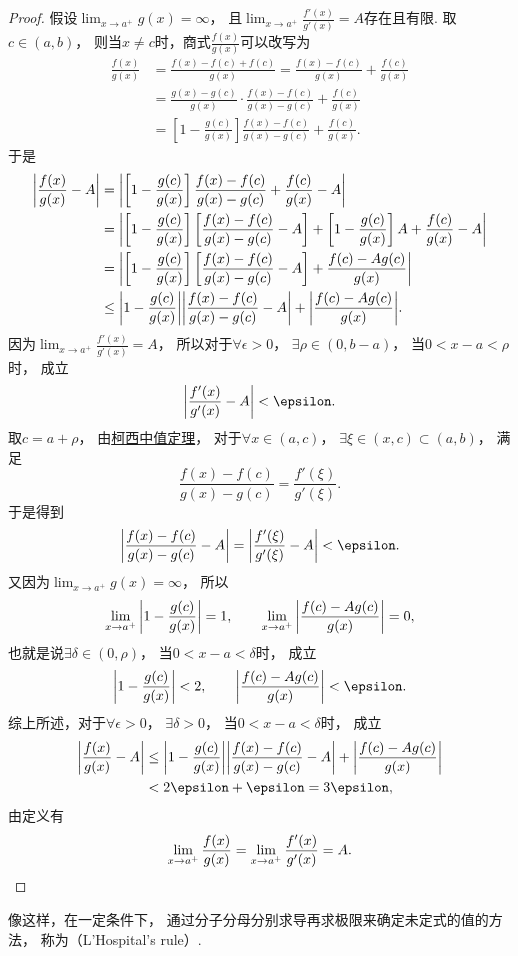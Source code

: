 \begin{theorem}[洛必达法则]
\begin{proof}
假设\(\lim_{x \to a^+} g(x) = \infty\)，
且\(\lim_{x \to a^+} \frac{f'(x)}{g'(x)} = A\)存在且有限.
取\(c\in(a,b)\)，
则当\(x \neq c\)时，商式\(\frac{f(x)}{g(x)}\)可以改写为\begin{align*}
	\frac{f(x)}{g(x)}
	&= \frac{f(x) - f(c) + f(c)}{g(x)}
	= \frac{f(x) - f(c)}{g(x)} + \frac{f(c)}{g(x)} \\
	&= \frac{g(x) - g(c)}{g(x)} \cdot \frac{f(x) - f(c)}{g(x) - g(c)} + \frac{f(c)}{g(x)} \\
	&= \left[1 - \frac{g(c)}{g(x)}\right] \frac{f(x) - f(c)}{g(x) - g(c)} + \frac{f(c)}{g(x)}.
\end{align*}
于是\begin{align*}
	\abs{\frac{f(x)}{g(x)} - A}
	&= \abs{
		\left[1 - \frac{g(c)}{g(x)}\right] \frac{f(x) - f(c)}{g(x) - g(c)}
		+ \frac{f(c)}{g(x)} - A
	} \\
	&= \abs{
		\left[1 - \frac{g(c)}{g(x)}\right]
		\left[\frac{f(x) - f(c)}{g(x) - g(c)} - A\right]
		+ \left[1 - \frac{g(c)}{g(x)}\right] A
		+ \frac{f(c)}{g(x)} - A
	} \\
	&= \abs{
		\left[1 - \frac{g(c)}{g(x)}\right]
		\left[\frac{f(x) - f(c)}{g(x) - g(c)} - A\right]
		+ \frac{f(c) - A g(c)}{g(x)}
	} \\
	&\leq \abs{1 - \frac{g(c)}{g(x)}}
	\abs{\frac{f(x) - f(c)}{g(x) - g(c)} - A}
	+ \abs{\frac{f(c) - A g(c)}{g(x)}}.
\end{align*}
因为\(\lim_{x \to a^+} \frac{f'(x)}{g'(x)} = A\)，
所以对于\(\forall\epsilon>0\)，
\(\exists\rho\in(0,b-a)\)，
当\(0<x-a<\rho\)时，
成立\[
	\abs{\frac{f'(x)}{g'(x)} - A} < \epsilon.
\]
取\(c=a+\rho\)，
由\hyperref[theorem:微分中值定理.柯西中值定理]{柯西中值定理}，
对于\(\forall x \in (a,c)\)，
\(\exists\xi\in(x,c)\subset(a,b)\)，
满足\[
	\frac{f(x) - f(c)}{g(x) - g(c)} = \frac{f'(\xi)}{g'(\xi)}.
\]
于是得到\[
	\abs{\frac{f(x) - f(c)}{g(x) - g(c)} - A}
	= \abs{\frac{f'(\xi)}{g'(\xi)} - A}
	< \epsilon.
\]
又因为\(\lim_{x \to a^+} g(x) = \infty\)，
所以\[
	\lim_{x \to a^+} \abs{1 - \frac{g(c)}{g(x)}} = 1,
	\qquad
	\lim_{x \to a^+} \abs{\frac{f(c) - A g(c)}{g(x)}} = 0,
\]
也就是说\(\exists\delta\in(0,\rho)\)，
当\(0<x-a<\delta\)时，
成立\[
	\abs{1-\frac{g(c)}{g(x)}} < 2, \qquad
	\abs{\frac{f(c) - A g(c)}{g(x)}} < \epsilon.
\]
综上所述，对于\(\forall\epsilon>0\)，
\(\exists\delta>0\)，
当\(0<x-a<\delta\)时，
成立\begin{align*}
	\abs{\frac{f(x)}{g(x)} - A}
	&\leq \abs{1 - \frac{g(c)}{g(x)}}
	\abs{\frac{f(x) - f(c)}{g(x) - g(c)} - A}
	+ \abs{\frac{f(c) - A g(c)}{g(x)}} \\
	&< 2\epsilon + \epsilon = 3\epsilon,
\end{align*}
由定义有\[
	\lim_{x \to a^+} \frac{f(x)}{g(x)}
	= \lim_{x \to a^+} \frac{f'(x)}{g'(x)}
	= A.
	\qedhere
\]
\end{proof}
\end{theorem}
像这样，在一定条件下，
通过分子分母分别求导再求极限来确定未定式的值的方法，
称为（L'Hospital's rule）.

